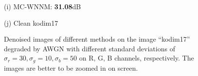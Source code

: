 \documentclass[10pt,onecolumn,letterpaper]{article}
\begin{document}
\begin{figure}
{\begin{minipage}[t]{0.195\textwidth}
{\footnotesize (i) MC-WNNM: \textbf{31.08}dB}
\end{minipage}
\begin{minipage}[t]{0.195\textwidth}
\centering
{}
{\footnotesize (j) Clean kodim17}
\end{minipage}
}
\caption{Denoised images of different methods on the image ``kodim17'' degraded by AWGN with different standard deviations of $\sigma_{r}=30, \sigma_{g}=10, \sigma_{b}=50$ on R, G, B channels, respectively. The images are better to be zoomed in on screen.}
\label{f1}
\vspace{2mm}
\end{figure}
\end{document}
